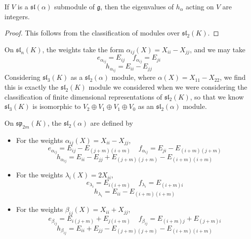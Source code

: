 \begin{lemma}
    If $V$ is a $\mathfrak{sl}(\alpha)$ submodule of $\mathfrak{g}$, then the eigenvalues of $h_\alpha$ acting on $V$ are integers.
\end{lemma}
\begin{proof}
    This follows from the classification of modules over $\mathfrak{sl}_2(K)$.
\end{proof}

\begin{example}
    On $\mathfrak{sl}_n(K)$, the weights take the form $\alpha_{ij}(X) = X_{ii} - X_{jj}$, and we may take
    \[ e_{\alpha_{ij}} = E_{ij}\ \ \ \ \ f_{\alpha_{ij}} = E_{ji} \]
    \[ h_{\alpha_{ij}} = E_{ii} - E_{jj} \]
    Considering $\mathfrak{sl}_3(K)$ as a $\mathfrak{sl}_2(\alpha)$ module, where $\alpha(X) = X_{11} - X_{22}$, we find this is exactly the $\mathfrak{sl}_2(K)$ module we considered when we were considering the classification of finite dimensional representations of $\mathfrak{sl}_2(K)$, so that we know $\mathfrak{sl}_3(K)$ is isomorphic to $V_2 \oplus V_1 \oplus V_1 \oplus V_0$ as an $\mathfrak{sl}_2(\alpha)$ module.
\end{example}

\begin{example}
    On $\mathfrak{sp}_{2m}(K)$, the $\mathfrak{sl}_2(\alpha)$ are defined by
    \begin{itemize}
        \item For the weights $\alpha_{ij}(X) = X_{ii} - X_{jj}$,
        \[ e_{\alpha_{ij}} = E_{ij} - E_{(j+m)(i+m)}\ \ \ \ \ f_{\alpha_{ij}} = E_{ji} - E_{(i+m)(j+m)} \]
        \[ h_{\alpha_{ij}} = E_{ii} - E_{jj} + E_{(j+m)(j+m)} - E_{(i+m)(i+m)} \]

        \item For the weights $\lambda_i(X) = 2X_{ii}$,
        \[ e_{\lambda_i} = E_{i(i+m)}\ \ \ \ \ f_{\lambda_i} = E_{(i+m)i} \]
        \[ h_{\lambda_i} = E_{ii} - E_{(i+m)(i+m)} \]

        \item For the weights $\beta_{ij}(X) = X_{ii} + X_{jj}$,
        \[ e_{\beta_{ij}} = E_{i(j+m)} + E_{j(i+m)}\ \ \ \ \ f_{\beta_{ij}} = E_{(i+m)j} + E_{(j+m)i} \]
        \[ h_{\beta_{ij}} = E_{ii} + E_{jj} - E_{(j+m)(j+m)} - E_{(i+m)(i+m)} \]
    \end{itemize}
\end{example}

